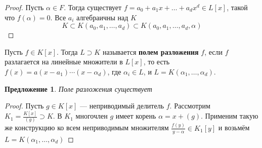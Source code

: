 \documentclass[a4paper]{article}
\numberwithin{theorem}{section}
\numberwithin{lemma}{section}
\newtheorem{proposition}{Предложение}
\numberwithin{proposition}{section}
\numberwithin{corollary}{section}
\begin{document}
\begin{proof}
Пусть $\alpha \in F$. Тогда существует $f = a_0 + a_1 x + \ldots + a_d x^d \in L[x]$, такой что $f(\alpha) = 0$. Все $a_i$ алгебраичны над $K$
\[K \subset K(a_0, a_1, \ldots, a_d) \subset K(a_0, a_1, \ldots, a_d, \alpha)\]
\end{proof}

Пусть $f \in K[x]$. Тогда $L \supset K$ называется \textbf{полем разложения} $f$, если $f$ разлагается на линейные множители в $L[x]$,
то есть $f(x) = a(x - a_1) \cdots (x - \alpha_d)$,
где $\alpha_i \in L$, и $L = K(\alpha_1, \ldots, \alpha_d)$.

\begin{proposition}
Поле разложения существует
\end{proposition}
\begin{proof}
Пусть $g \in K[x]$ --- неприводимый делитель $f$.
Рассмотрим $K_1 = \frac{K[x]}{(g)} \supset K$. В $K_1$ многочлен $g$
имеет корень $\alpha = x + (g)$. Применим такую же конструкцию
ко всем неприводимым множителям $\frac{f(y)}{y - \alpha} \in K_1[y]$
и возьмём $L = K(\alpha_1, \ldots, \alpha_d)$
\end{proof}
\end{document}
